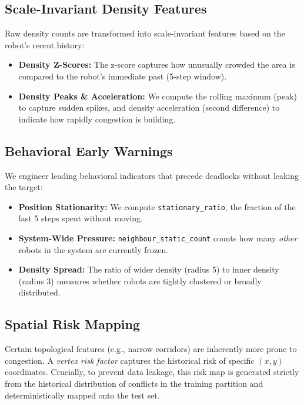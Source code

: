 \documentclass[12pt]{article}
\begin{document}
\subsection{Scale-Invariant Density Features}
Raw density counts are transformed into scale-invariant features based on the robot's recent history:
\begin{itemize}
    \item \textbf{Density Z-Scores:} The z-score captures how unusually crowded the area is compared to the robot's immediate past (5-step window).
    \item \textbf{Density Peaks \& Acceleration:} We compute the rolling maximum (peak) to capture sudden spikes, and density acceleration (second difference) to indicate how rapidly congestion is building.
\end{itemize}

\subsection{Behavioral Early Warnings}
We engineer leading behavioral indicators that precede deadlocks without leaking the target:
\begin{itemize}
    \item \textbf{Position Stationarity:} We compute \texttt{stationary\_ratio}, the fraction of the last 5 steps spent without moving.
    \item \textbf{System-Wide Pressure:} \texttt{neighbour\_static\_count} counts how many \textit{other} robots in the system are currently frozen.
    \item \textbf{Density Spread:} The ratio of wider density (radius 5) to inner density (radius 3) measures whether robots are tightly clustered or broadly distributed.
\end{itemize}

\subsection{Spatial Risk Mapping}
Certain topological features (e.g., narrow corridors) are inherently more prone to congestion. A \textit{vertex risk factor} captures the historical risk of specific $(x, y)$ coordinates. Crucially, to prevent data leakage, this risk map is generated strictly from the historical distribution of conflicts in the training partition and deterministically mapped onto the test set.
\end{document}
